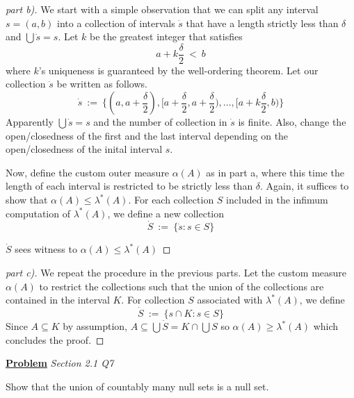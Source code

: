 \documentclass{article}
\newcommand{\new}[2]{
    \vspace{2mm}
    \noindent
    \textbf{
    \underline{#1}}
    \textit{{#2}}
    \
}
\begin{document}
\begin{proof} [part b)]
   We start with a simple observation that we can split any interval $s = (a, b)$ into a collection of intervals $\dot s$ that have a length strictly less than $\delta$ and $\bigcup \dot s = s$. Let $k$ be the greatest integer that satisfies 
   \begin{equation}
    a + k \frac \delta 2 \ < \ b
   \end{equation}
   where $k$'s uniqueness is guaranteed by the well-ordering theorem. Let our collection $\dot s$ be written as follows. 
   \begin{equation}
    \dot s \ := \ \bigg\{
    (a, a + \frac \delta 2), [a + \frac \delta 2, a + \frac \delta 2), \dots, [a + k \frac \delta 2, b)    
    \bigg\}
   \end{equation}
   Apparently $\bigcup \dot s = s$ and the number of collection in $\dot s$ is finite. Also, change the open/closedness of the first and the last interval depending on the open/closedness of the inital interval $s$. 

   Now, define the custom outer measure $\alpha(A)$ as in part a, where this time the length of each interval is restricted to be strictly less than $\delta$. Again, it suffices to show that $\alpha(A) \leq \lambda^*(A)$. For each collection $S$ included in the infimum computation of $\lambda^*(A)$, we define a new collection 
   \begin{equation}
    \dot S \ := \ \{\dot s : s \in S \}
   \end{equation}
   
   $\dot S$ sees witness to $\alpha(A) \leq \lambda^*(A)$
\end{proof}

\begin{proof}[part c)]
    We repeat the procedure in the previous parts. Let the custom measure $\alpha(A)$ to restrict the collections such that the union of the collections are contained in the interval $K$. For collection $S$ associated with $\lambda^*(A)$, we define 
    \begin{equation}
        \dot S \ := \ \{s \cap K: s \in S\}
    \end{equation}
    Since $A \subseteq K$ by assumption, $A \subseteq \bigcup \dot S = K \cap \bigcup S $ so $\alpha(A) \geq \lambda^*(A)$ which concludes the proof. 
\end{proof}

\new{Problem} {Section 2.1 Q7}

Show that the union of countably many null sets is a null set.
\end{document}
